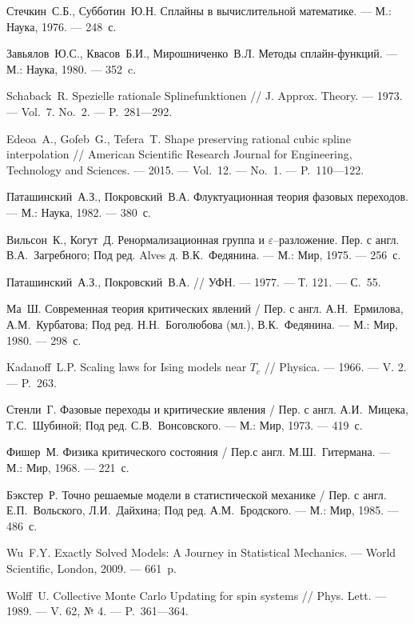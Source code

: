 \begin{thebibliography}{111}
  Стечкин~С.Б., Субботин~Ю.Н. Сплайны в вычислительной математике.
 --- М.: Наука, 1976. --- 248~с.

  Завьялов~Ю.С., Квасов~Б.И., Мирошниченко~В.Л. Методы сплайн-функций.
 --- М.: Наука, 1980. --- 352~c.

  Schaback~R.  Spezielle rationale Splinefunktionen // J. Approx. Theory. --- 1973. --- Vol.~7. No.~2. --- P.~281---292.  

 Edeoa~A., Gofeb~G., Tefera~T. Shape preserving rational cubic spline interpolation // American Scientific Research Journal for Engineering, Technology and Sciences. --- 2015. --- Vol.~12. --- No.~1. --- P.~110---122.  
 

 

Паташинский~А.З., Покровский~В.А. 
Флуктуационная теория фазовых переходов. 
--- М.: Наука, 1982. 
--- 380~с.

Вильсон~К., Когут~Д. 
Ренормализационная группа и $\varepsilon$--разложение. Пер. с англ. В.А.~Загребного; 
Под ред. Alves д. В.К.~Федянина. 
--- М.: Мир, 1975.
--- 256~с.

Паташинский~А.З., Покровский~В.А.
//
УФН. 
--- 1977. 
--- Т. 121. 
--- С.~55.

Ма~Ш. 
Современная теория критических явлений / Пер. с англ. А.Н.~Ермилова, А.М.~Курбатова; Под ред. Н.Н.~Боголюбова (мл.), В.К.~Федянина. 
--- М.: Мир, 1980. 
--- 298~с.

Kadanoff~L.P. 
Scaling laws for Ising models near $T_c$ 
// 
Physica. 
--- 1966. 
--- V. 2. 
--- P.~263.

Стенли~Г. 
Фазовые переходы и критические явления / Пер. с англ. А.И.~Мицека, Т.С.~Шубиной; Под ред. С.В.~Вонсовского. 
--- М.: Мир, 1973. 
--- 419~с.

Фишер~М. 
Физика критического состояния / Пер.с англ. М.Ш.~Гитермана. 
--- М.: Мир, 1968. 
--- 221~с.

Бэкстер~Р. 
Точно решаемые модели в статистической механике / Пер. с англ. Е.П.~Вольского, Л.И.~Дайхина; Под ред. А.М.~Бродского. 
--- М.: Мир, 1985. 
--- 486~с.

Wu~F.Y. 
Exactly Solved Models: A Journey in Statistical Mechanics. 
--- World Scientific, London, 2009. 
--- 661~p.

Wolff~U. 
Collective Monte Carlo Updating for spin systems // Phys. Lett. 
--- 1989. 
--- V. 62, № 4. 
--- P.~361---364.


\end{thebibliography}

